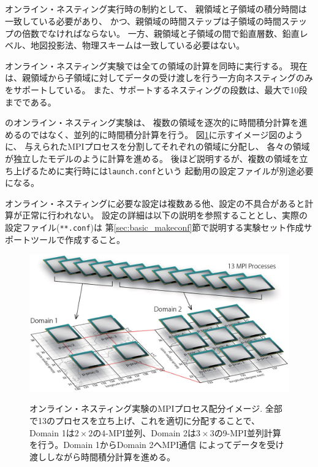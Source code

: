 \subsection{\SubsecOnlineNesting} \label{subsec:nest_online}

オンライン・ネスティング実行時の制約として、
親領域と子領域の積分時間は一致している必要があり、
かつ、親領域の時間ステップは子領域の時間ステップの倍数でなければならない。
一方、親領域と子領域の間で鉛直層数、鉛直レベル、地図投影法、物理スキームは一致している必要はない。

オンライン・ネスティング実験では全ての領域の計算を同時に実行する。
現在は、親領域から子領域に対してデータの受け渡しを行う一方向ネスティングのみをサポートしている。
また、サポートするネスティングの段数は、最大で10段までである。

\scalerm のオンライン・ネスティング実験は、
複数の領域を逐次的に時間積分計算を進めるのではなく、並列的に時間積分計算を行う。
図\ref{fig_mpisplit}に示すイメージ図のように、
与えられたMPIプロセスを分割してそれぞれの領域に分配し、
各々の領域が独立したモデルのように計算を進める。
後ほど説明するが、複数の領域を立ち上げるために実行時には\verb|launch.conf|という
起動用の設定ファイルが別途必要になる。

オンライン・ネスティングに必要な設定は複数ある他、設定の不具合があると計算が正常に行われない。
設定の詳細は以下の説明を参照することとし、実際の設定ファイル(\verb|**.conf|)は
第\ref{sec:basic_makeconf}節で説明する実験セット作成サポートツールで作成すること。


\begin{figure}[ht]
\begin{center}
  \includegraphics[width=0.8\hsize]{./figure/mpisplit_nesting.eps}\\
  \caption{オンライン・ネスティング実験のMPIプロセス配分イメージ. 全部で13のプロセスを立ち上げ、これを適切に分配することで、
           Domain 1は$2 \times 2$の4-MPI並列、Domain 2は$3 \times 3$の9-MPI並列計算を行う。Domain 1からDomain 2へMPI通信
           によってデータを受け渡ししながら時間積分計算を進める。}
  \label{fig_mpisplit}
\end{center}
\end{figure}




